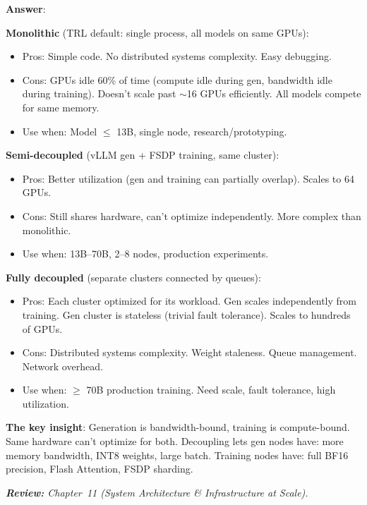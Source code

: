 \begin{questionbox}
\textbf{Answer}:

\textbf{Monolithic} (TRL default: single process, all models on same GPUs):

\begin{itemize}
  \item Pros: Simple code. No distributed systems complexity. Easy debugging.
  \item Cons: GPUs idle 60\% of time (compute idle during gen, bandwidth idle during training). Doesn’t scale past $\sim$16 GPUs efficiently. All models compete for same memory.
  \item Use when: Model $\leq$ 13B, single node, research/prototyping.
\end{itemize}

\textbf{Semi-decoupled} (vLLM gen + FSDP training, same cluster):

\begin{itemize}
  \item Pros: Better utilization (gen and training can partially overlap). Scales to 64 GPUs.
  \item Cons: Still shares hardware, can’t optimize independently. More complex than monolithic.
  \item Use when: 13B--70B, 2--8 nodes, production experiments.
\end{itemize}

\textbf{Fully decoupled} (separate clusters connected by queues):

\begin{itemize}
  \item Pros: Each cluster optimized for its workload. Gen scales independently from training. Gen cluster is stateless (trivial fault tolerance). Scales to hundreds of GPUs.
  \item Cons: Distributed systems complexity. Weight staleness. Queue management. Network overhead.
  \item Use when: $\geq$ 70B production training. Need scale, fault tolerance, high utilization.
\end{itemize}

\textbf{The key insight}: Generation is bandwidth-bound, training is compute-bound. Same hardware can’t optimize for both. Decoupling lets gen nodes have: more memory bandwidth, INT8 weights, large batch. Training nodes have: full BF16 precision, Flash Attention, FSDP sharding.

\emph{\textbf{Review:} Chapter~11 (System Architecture \& Infrastructure at Scale).}
\end{questionbox}

